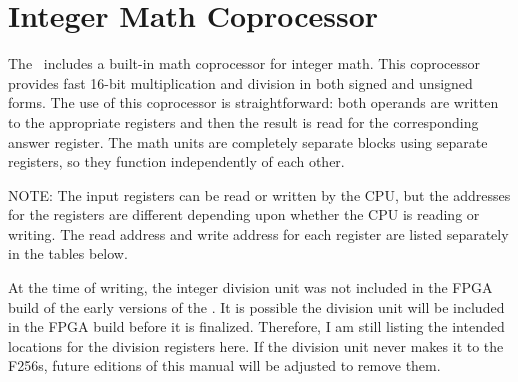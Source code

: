 \chapter{Integer Math Coprocessor}
\label{sec:int_math_copro}

The \jr\ includes a built-in math coprocessor for integer math. This coprocessor provides fast 16-bit multiplication and division in both signed and unsigned forms. The use of this coprocessor is straightforward: both operands are written to the appropriate registers and then the result is read for the corresponding answer register. The math units are completely separate blocks using separate registers, so they function independently of each other.

NOTE: The input registers can be read or written by the CPU, but the addresses for the registers are different depending upon whether the CPU is reading or writing. The read address and write address for each register are listed separately in the tables below.

\begin{leftbar}
    At the time of writing, the integer division unit was not included in the FPGA build of the early versions of the \jr. It is possible the division unit will be included in the FPGA build before it is finalized. Therefore, I am still listing the intended locations for the division registers here. If the division unit never makes it to the F256s, future editions of this manual will be adjusted to remove them.
\end{leftbar}

